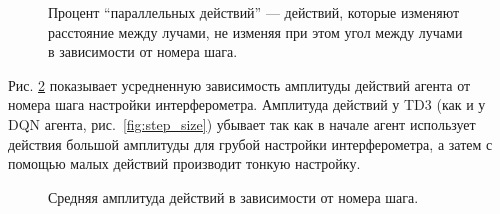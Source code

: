 \begin{figure}[ht]
\caption{Процент ``параллельных действий'' --- действий, которые изменяют расстояние между лучами, не изменяя при этом угол между лучами в зависимости от номера шага.}
\label{fig:anal2_parallel_actions}
\end{figure}

Рис. \ref{fig:anal2_act_norm} показывает усредненную зависимость амплитуды действий агента от номера шага настройки интерферометра. Амплитуда действий у TD3 (как и у DQN агента, рис.~\ref{fig:step_size}) убывает так как в начале агент использует действия большой амплитуды для грубой настройки интерферометра, а затем с помощью малых действий производит тонкую настройку. 

\begin{figure}[ht]
\caption{Средняя амплитуда действий в зависимости от номера шага.}
\label{fig:anal2_act_norm}
\end{figure}


